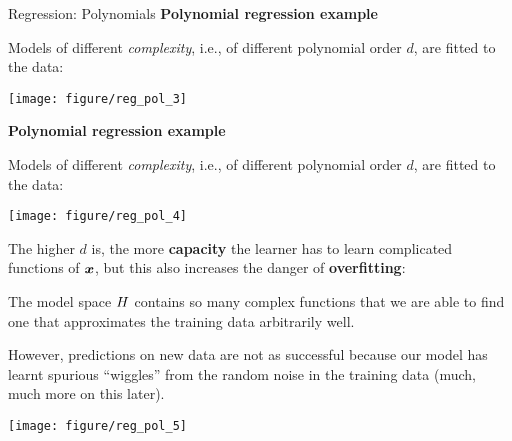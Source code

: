 \begin{vbframe}{Regression: Polynomials}
\textbf{Polynomial regression example}

Models of different \emph{complexity}, i.e., of different polynomial order $d$, are fitted to the data:

\begin{knitrout}\scriptsize
{}\color{fgcolor}

{\centering \texttt{[image: figure/reg\_pol\_3]} 

}



\end{knitrout}

\framebreak

\textbf{Polynomial regression example}

Models of different \emph{complexity}, i.e., of different polynomial order $d$, are fitted to the data:

\begin{knitrout}\scriptsize
{}\color{fgcolor}

{\centering \texttt{[image: figure/reg\_pol\_4]} 

}



\end{knitrout}

\framebreak

The higher $d$ is, the more \textbf{capacity} the learner has to learn complicated functions of $\bm{x}$, but
this also increases the danger of \textbf{overfitting}:\\
\lz

The model space $H$ contains so many complex functions that we are able to find one that approximates
the training data arbitrarily well.
\lz

However, predictions on new data are not as successful because our model has learnt spurious \enquote{wiggles} from the random noise in the training data (much, much more on this later).

\framebreak

\begin{knitrout}\scriptsize
{}\color{fgcolor}

{\centering \texttt{[image: figure/reg\_pol\_5]} 

}



\end{knitrout}

\end{vbframe}
\endlecture

